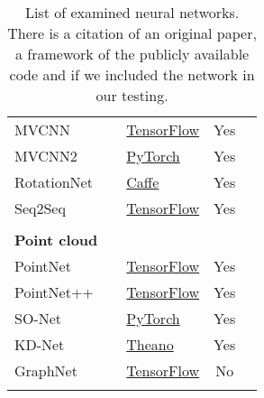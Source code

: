\begin{table}[]
\begin{tabular}{lllcc}
		MVCNN                  & \cite{su_multi-view_2015}                & \href{https://github.com/WeiTang114/MVCNN-TensorFlow}{TensorFlow}                      &     Yes     &  \\
		MVCNN2                 & \cite{su_deeper_2018}                    & \href{https://github.com/jongchyisu/mvcnn_pytorch}{PyTorch}                            &     Yes     &  \\
		RotationNet            & \cite{kanezaki_rotationnet:_2018}        & \href{https://github.com/kanezaki/rotationnet}{Caffe}                                  &     Yes     &  \\
		Seq2Seq                & \cite{zhizhong_seqviews2seqlabels:_2018} & \href{https://github.com/mingyangShang/SeqViews2SeqLabels}{TensorFlow}                 &     Yes     &  \\
		                       &                                          &                                                                                        &             &  \\
		\textbf{Point cloud  } &                                          &                                                                                        &             &  \\
		PointNet               & \cite{qi_pointnet:_2016}                 & \href{https://github.com/charlesq34/pointnet}{TensorFlow}                              &     Yes     &  \\
		PointNet++             & \cite{qi_pointnet++:_2017}               & \href{https://github.com/charlesq34/pointnet2}{TensorFlow}                             &     Yes     &  \\
		SO-Net                 & \cite{li_so-net:_2018}                   & \href{https://github.com/lijx10/SO-Net}{PyTorch}                                       &     Yes     &  \\
		KD-Net                 & \cite{klokov_escape_2017}                & \href{https://github.com/Regenerator/kdnets}{Theano}                                   &     Yes     &  \\
		GraphNet               & \cite{dominguez_general-purpose_2018}    & \href{https://github.com/WDot/G3DNet}{TensorFlow}                                      &     No      &  \\
		                       &                                          &                                                                                        &             &  \\ \hline
	\end{tabular}
\caption{List of examined neural networks. There is a citation of an original paper, a framework of the publicly available code and if we included the network in our testing.}
\label{Table:1}
\end{table}